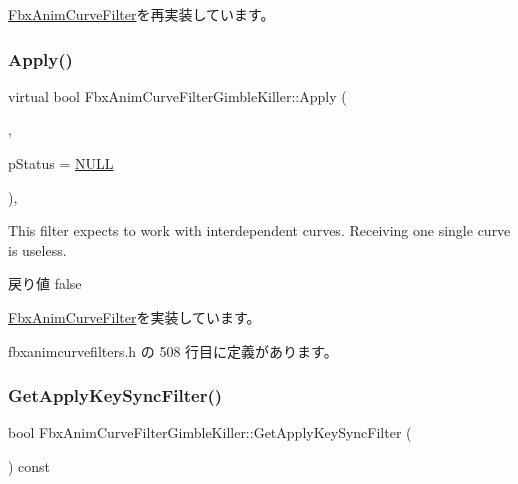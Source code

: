 \hyperlink{class_fbx_anim_curve_filter_aca6a41fbc4d9019b20df7adccfa6ed3c}{Fbx\+Anim\+Curve\+Filter}を再実装しています。

\mbox{\label{class_fbx_anim_curve_filter_gimble_killer_ac74aff21904a7cb323f2ed4bafae6fa6}} 
\subsubsection{\texorpdfstring{Apply()}{Apply()}\hspace{0.1cm}{\footnotesize\ttfamily [5/5]}}
{\footnotesize\ttfamily virtual bool Fbx\+Anim\+Curve\+Filter\+Gimble\+Killer\+::\+Apply (\begin{DoxyParamCaption}\item[{\hyperlink{class_fbx_anim_curve}{Fbx\+Anim\+Curve} \&}]{,  }\item[{\hyperlink{class_fbx_status}{Fbx\+Status} $\ast$}]{p\+Status = {\ttfamily \hyperlink{fbxarch_8h_a070d2ce7b6bb7e5c05602aa8c308d0c4}{N\+U\+LL}} }\end{DoxyParamCaption})\hspace{0.3cm}{\ttfamily [inline]}, {\ttfamily [virtual]}}

This filter expects to work with interdependent curves. Receiving one single curve is useless. \begin{DoxyReturn}{戻り値}
{\ttfamily false} 
\end{DoxyReturn}


\hyperlink{class_fbx_anim_curve_filter_a6a69996c47c0e6f63a0f8b0d5fa806a0}{Fbx\+Anim\+Curve\+Filter}を実装しています。



 fbxanimcurvefilters.\+h の 508 行目に定義があります。

\mbox{\label{class_fbx_anim_curve_filter_gimble_killer_ae75014aea69ea161d87be698906ed797}} 
\subsubsection{\texorpdfstring{Get\+Apply\+Key\+Sync\+Filter()}{GetApplyKeySyncFilter()}}
{\footnotesize\ttfamily bool Fbx\+Anim\+Curve\+Filter\+Gimble\+Killer\+::\+Get\+Apply\+Key\+Sync\+Filter (\begin{DoxyParamCaption}{ }\end{DoxyParamCaption}) const}



